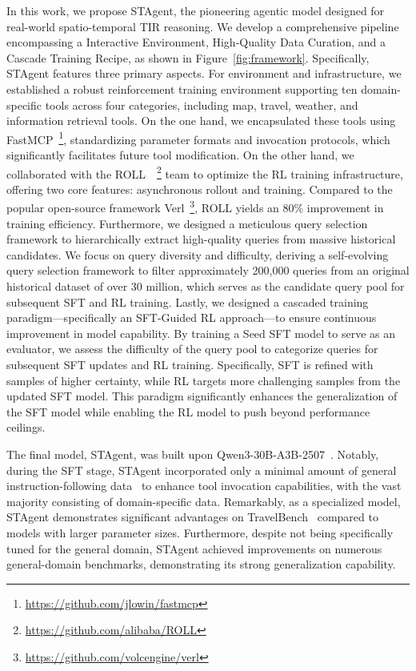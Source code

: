 \documentclass{article} %
\newcommand{\model}{STAgent\xspace}
\begin{document}
In this work, we propose \model, the pioneering agentic model designed for real-world spatio-temporal TIR reasoning. We develop a comprehensive pipeline encompassing a Interactive Environment, High-Quality Data Curation, and a Cascade Training Recipe, as shown in Figure~\ref{fig:framework}. Specifically, \model features three primary aspects. For environment and infrastructure, we established a robust reinforcement training environment supporting ten domain-specific tools across four categories, including map, travel, weather, and information retrieval tools. On the one hand, we encapsulated these tools using FastMCP~\footnote{\url{https://github.com/jlowin/fastmcp}}, standardizing parameter formats and invocation protocols, which significantly facilitates future tool modification. On the other hand, we collaborated with the ROLL~\cite{roll}~\footnote{\url{https://github.com/alibaba/ROLL}} team to optimize the RL training infrastructure, offering two core features: asynchronous rollout and training. Compared to the popular open-source framework Verl~\footnote{\url{https://github.com/volcengine/verl}}, ROLL yields an 80\% improvement in training efficiency. Furthermore, we designed a meticulous query selection framework to hierarchically extract high-quality queries from massive historical candidates. We focus on query diversity and difficulty, deriving a self-evolving query selection framework to filter approximately 200,000 queries from an original historical dataset of over 30 million, which serves as the candidate query pool for subsequent SFT and RL training. Lastly, we designed a cascaded training paradigm—specifically an SFT-Guided RL approach—to ensure continuous improvement in model capability. By training a Seed SFT model to serve as an evaluator, we assess the difficulty of the query pool to categorize queries for subsequent SFT updates and RL training. Specifically, SFT is refined with samples of higher certainty, while RL targets more challenging samples from the updated SFT model. This paradigm significantly enhances the generalization of the SFT model while enabling the RL model to push beyond performance ceilings.

 

The final model, \model, was built upon Qwen3-30B-A3B-2507~\cite{qwen3}. Notably, during the SFT stage, \model incorporated only a minimal amount of general instruction-following data~\cite{toucan} to enhance tool invocation capabilities, with the vast majority consisting of domain-specific data. Remarkably, as a specialized model, \model demonstrates significant advantages on TravelBench~\cite{Cheng2025TravelBenchAR} compared to models with larger parameter sizes. Furthermore, despite not being specifically tuned for the general domain, \model achieved improvements on numerous general-domain benchmarks, demonstrating its strong generalization capability.
\end{document}
